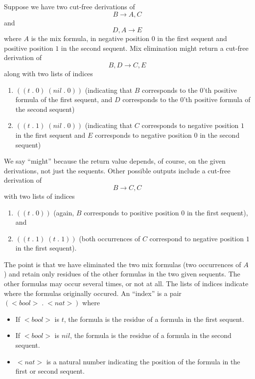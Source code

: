Suppose we have two cut-free derivations of
$$B\rightarrow A,C$$
and
$$D,A\rightarrow E$$
where $A$ is the mix formula, in negative position $0$ in the
first sequent and positive position $1$ in the second sequent.
Mix elimination might return a cut-free derivation of
$$B,D\rightarrow C,E$$
along with two lists of indices
\begin{enumerate}
\item $((t\; . \; 0) \; (nil\; . \; 0))$ (indicating that $B$ corresponds
to the $0$'th positive formula of the first sequent, and
$D$ corresponds to the $0$'th positive formula of the second sequent)
\item $((t\; . \; 1) \; (nil\; . \; 0))$ (indicating that $C$ corresponds
to negative position $1$ in the first sequent and
$E$ corresponds to negative position $0$ in the second sequent)
\end{enumerate}
We say ``might'' because the return value depends, of course,
on the given derivations, not just the sequents.
Other possible outputs include a cut-free derivation of
$$B\rightarrow C,C$$
with two lists of indices
\begin{enumerate}
\item $((t\; . \; 0))$ (again, $B$ corresponds to positive position $0$ in
the first sequent), and
\item $((t\; . \; 1)\; (t\; . \; 1))$ (both occurrences of $C$ correspond
to negative position $1$ in the first sequent).
\end{enumerate}

The point is that we have eliminated the two mix formulas
(two occurrences of $A$) and retain only residues of the other
formulas in the two given sequents.  The other formulas may occur
several times, or not at all.  The lists of indices indicate
where the formulas originally occured.  An ``index'' is a pair
$(<bool>\; . \; <nat>)$ where
\begin{itemize}
\item If $<bool>$ is $t$, the formula is the residue of a formula
in the first sequent.
\item If $<bool>$ is $nil$, the formula is the residue of a formula
in the second sequent.
\item $<nat>$ is a natural number indicating the position of the
formula in the first or second sequent.
\end{itemize}

